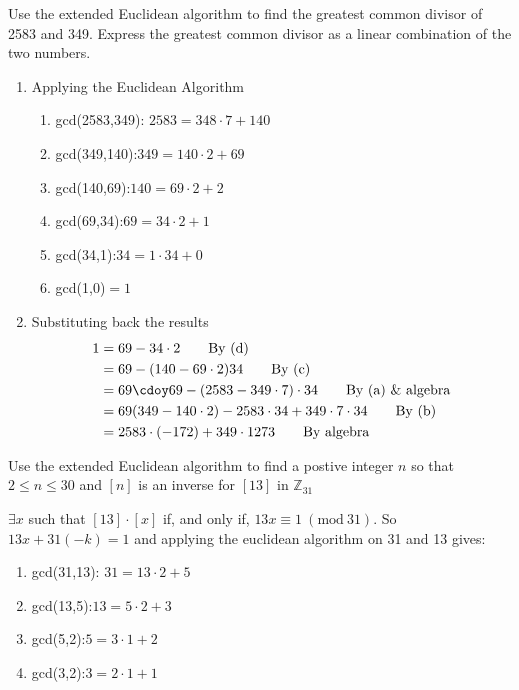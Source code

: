 \documentclass[12pt,letterpaper, onecolumn]{exam}
\newcommand{\Mod}[1]{\ (\mathrm{mod}\ #1)}
\begin{document}
	\begin{questions}
			\setcounter{question}{18}\question Use the extended Euclidean algorithm to find the greatest common divisor of 2583 and 349. Express the greatest common divisor as a linear combination of the two numbers.
			\begin{solution}
			\begin{enumerate}
				\item Applying the Euclidean Algorithm
				\begin{enumerate}[label=(\alph*)] 
					\item gcd(2583,349): $2583=348\cdot7+140$
					\item gcd(349,140):$349=140\cdot2+69$
					\item gcd(140,69):$140=69\cdot2+2$
					\item gcd(69,34):$69=34\cdot2+1$
					\item gcd(34,1):$34=1\cdot34+0$
					\item gcd(1,0)$=1$
				\end{enumerate}
				\item Substituting back the results
				\begin{align*}
					1&=69-34\cdot2\tag*{By (d)}\\
					&=69-(140-69\cdot2)34\tag*{By (c)}\\
					&=69\cdoy69-(2583-349\cdot7)\cdot34\tag*{By (a) \& algebra}\\
					&=69(349-140\cdot2)-2583\cdot34+349\cdot7\cdot34\tag*{By (b)}\\
					&=2583\cdot(-172)+349\cdot1273\tag*{By algebra}
				\end{align*}
			\end{enumerate}
			\end{solution}
			\setcounter{question}{40}\question Use the extended Euclidean algorithm to find a postive integer $n$ so that $2\leq n \leq 30$ and $[n]$ is an inverse for $[13]$ in $\mathbb{Z}_{31}$
			\begin{solution}
				$\exists x$ such that $[13]\cdot[x]$ if, and only if, $13x\equiv1\Mod{31}$. So $13x+31(-k)=1$ and applying the euclidean algorithm on 31 and 13 gives:
					\begin{enumerate}[label=(\alph*)] 
					\item gcd(31,13): $31=13\cdot2+5$
					\item gcd(13,5):$13=5\cdot2+3$
					\item gcd(5,2):$5=3\cdot1+2$
					\item gcd(3,2):$3=2\cdot1+1$

\end{enumerate}
\end{solution}
\end{questions}
\end{document}
